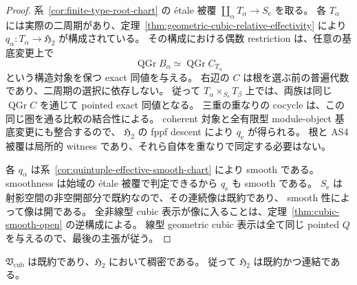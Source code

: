 \begin{proof}
系~\ref{cor:finite-type-root-chart} の étale 被覆
$\coprod_\alpha T_\alpha\to S_{\mathrm e}$ を取る。
各 $T_\alpha$ には実際の二周期があり、定理~\ref{thm:geometric-cubic-relative-effectivity} により
$q_\alpha:T_\alpha\to\mathfrak H_2$ が構成されている。
その構成における偶数 restriction は、任意の基底変更上で
\[
 \operatorname{QGr}B_\alpha\simeq\operatorname{QGr}C_{T_\alpha}
\]
という構造対象を保つ exact 同値を与える。
右辺の $C$ は根を選ぶ前の普遍代数であり、二周期の選択に依存しない。
従って $T_\alpha\times_{S_{\mathrm e}}T_\beta$ 上では、両族は同じ
$\operatorname{QGr}C$ を通じて pointed exact 同値となる。
三重の重なりの cocycle は、この同じ圏を通る比較の結合性による。
coherent 対象と全有限型 module-object 基底変更にも整合するので、
$\mathfrak H_2$ の fppf descent により $q_{\mathrm e}$ が得られる。
根と AS4 被覆は局所的 witness であり、それら自体を重なりで同定する必要はない。

各 $q_\alpha$ は系~\ref{cor:quintuple-effective-smooth-chart} により smooth である。
smoothness は始域の étale 被覆で判定できるから $q_{\mathrm e}$ も smooth である。
$S_{\mathrm e}$ は射影空間の非空開部分で既約なので、その連続像は既約であり、
smooth 性によって像は開である。
全非線型 cubic 表示が像に入ることは、定理~\ref{thm:cubic-smooth-open} の逆構成による。
線型 geometric cubic 表示は全て同じ pointed $Q$ を与えるので、最後の主張が従う。
\end{proof}

\begin{proposition}[全内在的モジュライの既約性]
\label{prop:global-h2-irreducible}
$\mathfrak V_{\mathrm{cub}}$ は既約であり、$\mathfrak H_2$ において稠密である。
従って $\mathfrak H_2$ は既約かつ連結である。
\end{proposition}

